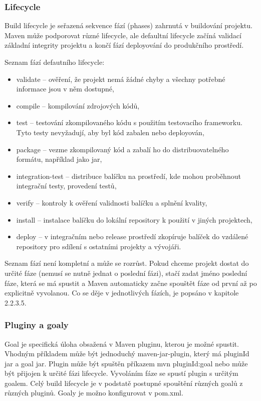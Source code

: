 \documentclass[11pt,twoside,a4paper]{book}
\begin{document}
\subsubsection{Lifecycle}

Build lifecycle je seřazená sekvence fází (phases) zahrnutá v buildování projektu. Maven
může podporovat různé lifecycle, ale defaultní lifecycle začíná validací základní integrity
projektu a končí fází deployování do produkčního prostředí.

Seznam fází defautního lifecycle:

\begin{itemize}
  \item validate – ověření, že projekt nemá žádné chyby a všechny potřebné informace jsou v
něm dostupné,
  \item compile – kompilování zdrojových kódů,
  \item test – testování zkompilovaného kódu s použitím testovacího frameworku. Tyto testy
nevyžadují, aby byl kód zabalen nebo deployován,
  \item package – vezme zkompilovaný kód a zabalí ho do distribuovatelného formátu,
například jako jar,
\item integration-test – distribuce balíčku na prostředí, kde mohou proběhnout integrační
testy, provedení testů,
\item verify – kontroly k ověření validnosti balíčku a splnění kvality,
\item install – instalace balíčku do lokální repository k použití v jiných projektech,
\item deploy – v integračním nebo release prostředí zkopíruje balíček do vzdálené repository
pro sdílení s ostatními projekty a vývojáři.
\end{itemize}

Seznam fází není kompletní a může se rozrůst. Pokud chceme projekt dostat do určité fáze
(nemusí se nutně jednat o poslední fázi), stačí zadat jméno poslední fáze, která se má spustit a
Maven automaticky začne spouštět fáze od první až po explicitně vyvolanou. Co se děje v
jednotlivých fázích, je popsáno v kapitole 2.2.3.5.

\subsubsection{Pluginy a goaly}

Goal je specifická úloha obsažená v Maven pluginu, kterou je možné spustit. Vhodným
příkladem může být jednoduchý maven-jar-plugin, který má pluginId jar a goal jar. Plugin
může být spuštěn příkazem mvn pluginId:goal nebo může být přijojen k určité fázi lifecycle.
Vyvoláním fáze se spustí plugin s určitým goalem. Celý build lifecycle je v podstatě postupné
spouštění různých goalů z různých pluginů. Goaly je možno konfigurovat v pom.xml.
\end{document}
